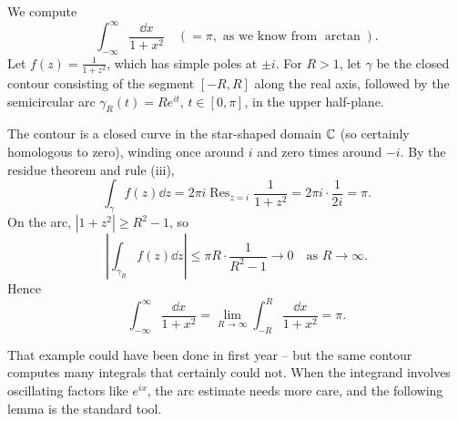 \documentclass[a4paper]{scrartcl}
\begin{document}
\begin{example}
    We compute
    $$
    \int_{-\infty}^{\infty} \frac{\dd x}{1 + x^2} \quad (= \pi, \text{ as we know from } \arctan).
    $$
    Let $f(z) = \frac{1}{1 + z^2}$, which has simple poles at $\pm i$. For $R > 1$, let $\gamma$ be the closed contour consisting of the segment $[-R, R]$ along the real axis, followed by the semicircular arc $\gamma_R(t) = Re^{it}$, $t \in [0, \pi]$, in the upper half-plane.

    \begin{center}
    \end{center}

    The contour is a closed curve in the star-shaped domain $\mathbb{C}$ (so certainly homologous to zero), winding once around $i$ and zero times around $-i$. By the residue theorem and rule (iii),
    $$
    \int_\gamma f(z) \dd z = 2 \pi i \operatorname{Res}_{z = i} \frac{1}{1 + z^2} = 2 \pi i \cdot \frac{1}{2i} = \pi.
    $$
    On the arc, $|1 + z^2| \geq R^2 - 1$, so
    $$
    \left|\int_{\gamma_R} f(z) \dd z \right| \leq \pi R \cdot \frac{1}{R^2 - 1} \rightarrow 0 \quad \text{as } R \rightarrow \infty.
    $$
    Hence
    $$
    \int_{-\infty}^{\infty} \frac{\dd x}{1 + x^2} = \lim_{R \to \infty} \int_{-R}^{R} \frac{\dd x}{1 + x^2} = \pi.
    $$
\end{example}

That example could have been done in first year -- but the same contour computes many integrals that certainly could not. When the integrand involves oscillating factors like $e^{ix}$, the arc estimate needs more care, and the following lemma is the standard tool.
\end{document}
